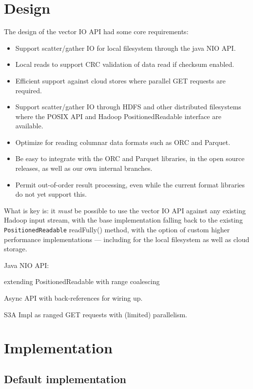 \documentclass[manuscript]{acmart}
\begin{document}

\section{Design}
\label{sec:design}

The design of the vector IO API had some core requirements:
\begin{itemize}
  \item Support scatter/gather IO for local filesystem through the java NIO API.
  \item Local reads to support CRC validation of data read if checksum enabled.
  \item Efficient support against cloud stores where parallel GET requests are required.
  \item Support scatter/gather IO through HDFS and other distributed filesystems
        where the POSIX API and Hadoop PositionedReadable interface are available.
  \item Optimize for reading columnar data formats such as ORC and Parquet.
  \item Be easy to integrate with the ORC and Parquet libraries, in the open
        source releases, as well as our own internal branches.
  \item Permit out-of-order result processing, even while the current format libraries
        do not yet support this.
\end{itemize}

What is key is: it \emph{must} be possible to use the vector IO API against
any existing Hadoop input stream, with the base implementation
falling back to the existing \texttt{PositionedReadable} readFully() method,
with the option of custom higher performance implementations --- including
for the local filesystem as well as cloud storage.

Java NIO API:

extending PositionedReadable with range coalescing

Async API with back-references for wiring up.

S3A Impl as ranged GET requests with (limited) parallelism.

\section {Implementation}
\label{sec:implementation}

\subsection{Default implementation}
\end{document}
